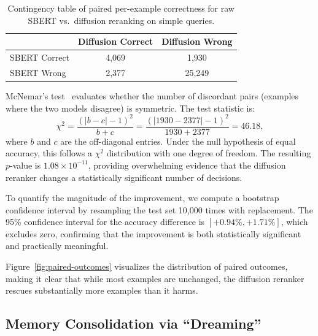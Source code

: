 \documentclass{article}
\begin{document}
\begin{table}[htbp]
\centering
\caption{Contingency table of paired per-example correctness for raw SBERT vs.\ diffusion reranking on simple queries.}
\label{tab:contingency}
\begin{tabular}{lcc}
\toprule
 & Diffusion Correct & Diffusion Wrong \\
\midrule
SBERT Correct & 4,069 & 1,930 \\
SBERT Wrong & 2,377 & 25,249 \\
\bottomrule
\end{tabular}
\end{table}

McNemar's test~\cite{dietterich1998approximate} evaluates whether the number of discordant pairs (examples where the two models disagree) is symmetric. The test statistic is:
\begin{equation}
  \chi^2 = \frac{(|b - c| - 1)^2}{b + c} = \frac{(|1930 - 2377| - 1)^2}{1930 + 2377} = 46.18,
\end{equation}
where $b$ and $c$ are the off-diagonal entries. Under the null hypothesis of equal accuracy, this follows a $\chi^2$ distribution with one degree of freedom. The resulting $p$-value is $1.08 \times 10^{-11}$, providing overwhelming evidence that the diffusion reranker changes a statistically significant number of decisions.

To quantify the magnitude of the improvement, we compute a bootstrap confidence interval by resampling the test set 10,000 times with replacement. The 95\% confidence interval for the accuracy difference is $[+0.94\%, +1.71\%]$, which excludes zero, confirming that the improvement is both statistically significant and practically meaningful.

Figure~\ref{fig:paired-outcomes} visualizes the distribution of paired outcomes, making it clear that while most examples are unchanged, the diffusion reranker rescues substantially more examples than it harms.

\subsection{Memory Consolidation via ``Dreaming''}
\label{sec:dreaming}
\end{document}
